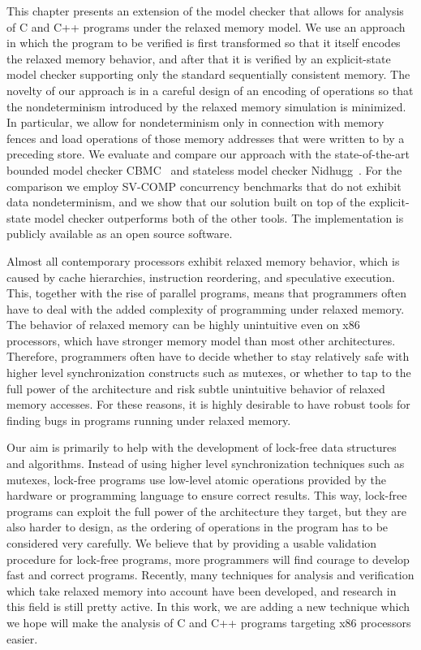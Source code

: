 
This chapter presents an extension of the \divine model checker that allows for
analysis of C and C++ programs under the \xtso relaxed memory model.
We use an approach in which the program to be verified is first transformed so
that it itself encodes the relaxed memory behavior, and after that it is
verified by an explicit-state model checker supporting only the standard
sequentially consistent memory.
The novelty of our approach is in a careful design of an encoding of \xtso
operations so that the nondeterminism introduced by the relaxed memory
simulation is minimized.
In particular, we allow for nondeterminism only in connection with memory
fences and load operations of those memory addresses that were written to by a
preceding store.
We evaluate and compare our approach with the state-of-the-art bounded model
checker CBMC~ and stateless model checker Nidhugg~.
For the comparison we employ SV-COMP concurrency benchmarks that do not exhibit
data nondeterminism, and we show that our solution built on top of the
explicit-state model checker outperforms both of the other tools.
The implementation is publicly available as an open source software.

Almost all contemporary processors exhibit relaxed memory behavior, which is
caused by cache hierarchies, instruction reordering, and speculative execution.
This, together with the rise of parallel programs, means that programmers often have to deal with the added complexity of programming under relaxed memory.
The behavior of relaxed memory can be highly unintuitive even on x86 processors, which have stronger memory model than most other architectures.
Therefore, programmers often have to decide whether to stay relatively safe with
higher level synchronization constructs such as mutexes, or whether to tap to the full power of the architecture and risk subtle unintuitive behavior of relaxed memory accesses.
For these reasons, it is highly desirable to have robust tools for finding bugs in programs running under relaxed memory.

Our aim is primarily to help with the development of lock-free data structures and algorithms.
Instead of using higher level synchronization techniques such as mutexes, lock-free programs use low-level atomic operations provided by the hardware or programming language to ensure correct results.
This way, lock-free programs can exploit the full power of the architecture they target, but they are also harder to design, as the ordering of operations in the program has to be considered very carefully.
We believe that by providing a usable validation procedure for lock-free
programs, more programmers will find courage to develop fast and correct programs.
Recently, many techniques for analysis and verification which take relaxed memory into account have been developed, and research in this field is still pretty active.
In this work, we are adding a new technique which we hope will make the analysis of C and C++ programs targeting x86 processors easier.

